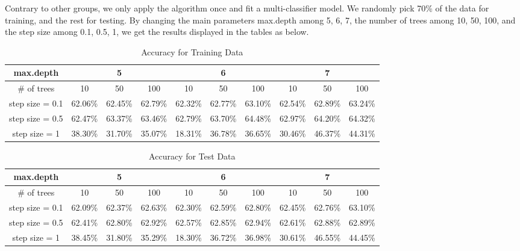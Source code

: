 \documentclass{article}
\begin{document}
\begin{spacing}{1}
\begin{large}
\noindent \indent Contrary to other groups, we only apply the algorithm once and fit a multi-classifier model. We randomly pick 70\% of the data for training, and the rest for testing. By changing the main parameters \cite{xg3} max.depth among 5, 6, 7, the number of trees among 10, 50, 100, and the step size among 0.1, 0.5, 1, we get the results displayed in the tables as below.
\begin{table}[h]
\centering
\caption{Accuracy for Training Data}
\label{Accuracy for Training Data}
\begin{tabular}{cccccccccc}
\hline
max.depth       & \multicolumn{3}{c}{5} & \multicolumn{3}{c}{6} & \multicolumn{3}{c}{7} \\ \hline
\# of trees     & 10    & 50    & 100   & 10  & 50       & 100  & 10    & 50    & 100   \\
step size = 0.1 & 62.06\%    & 62.45\%     & 62.79\%     & 62.32\%    & 62.77\%         & 63.10\%      & 62.54\%     & 62.89\%      & 63.24\%      \\
step size = 0.5 & 62.47\%    & 63.37\%       & 63.46\%      & 62.79\%   & 63.70\%  & 64.48\%     & 62.97\%       & 64.20\%      & 64.32\%      \\
step size = 1   &38.30\%       & 31.70\%      &35.07\%       &18.31\%     & 36.78\%         &36.65\%      &30.46\%       &46.37\%       &44.31\%       \\ \hline
\end{tabular}
\end{table}

\begin{table}[h]
\centering
\caption{Accuracy for Test Data}
\label{Accuracy for Test Data}
\begin{tabular}{cccccccccc}
\hline
max.depth       & \multicolumn{3}{c}{5} & \multicolumn{3}{c}{6} & \multicolumn{3}{c}{7} \\ \hline
\# of trees     & 10    & 50    & 100   & 10  & 50       & 100  & 10    & 50    & 100   \\
step size = 0.1 & 62.09\%      & 62.37\%     & 62.63\%      &62.30\%     & 62.59\%       & 62.80\%      & 62.45\%      & 62.76\%      & 63.10\%      \\
step size = 0.5 & 62.41\%     & 62.80\%     & 62.92\%      & 62.57\%    &62.85\%     & 62.94\%   & 62.61\%      & 62.88\%      & 62.89\%      \\
step size = 1   &38.45\%       & 31.80\%      & 35.29\%      &18.30\%     & 36.72\%         &  36.98\% &30.61\%       &46.55\%      &44.45\%     \\ \hline
\end{tabular}
\end{table}


\end{large}
\end{spacing}
\end{document}
